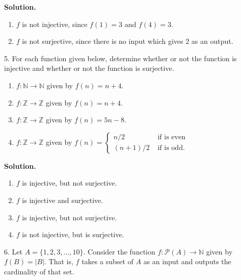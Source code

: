 \documentclass[10pt,]{book}
\theoremstyle{plain}
\theoremstyle{definition}
\theoremstyle{definition}
\theoremstyle{definition}
\def\N{\mathbb N}
\def\Z{\mathbb Z}
\def\pow{\mathcal P}
\newcommand{\amp}{ & }
\begin{document}
\begin{exerciselist}
\begin{enumerate}[label=(\alph*)]
\end{enumerate}
\par\smallskip
\par\smallskip
\noindent\textbf{Solution.}\hypertarget{solution-48}{}\quad
\leavevmode%
\begin{enumerate}[label=(\alph*)]
\item\hypertarget{li-305}{}\(f\) is not injective, since \(f(1) = 3\) and \(f(4) = 3\).\item\hypertarget{li-306}{}\(f\) is not surjective, since there is no input which gives 2 as an output.\end{enumerate}
\item[5.]\hypertarget{exercise-31}{}
            For each function given below, determine whether or not the function is injective and whether or not the function is surjective.
\leavevmode%
\begin{enumerate}[label=(\alph*)]
\item\hypertarget{li-307}{}\(f:\N \to \N\) given by \(f(n) = n+4\).\item\hypertarget{li-308}{}\(f:\Z \to \Z\) given by \(f(n) = n+4\).\item\hypertarget{li-309}{}\(f:\Z \to \Z\) given by \(f(n) = 5n - 8\).\item\hypertarget{li-310}{}\(f:\Z \to \Z\) given by \(f(n) = \begin{cases}n/2 \amp  \mbox{ if  is even} \\ (n+1)/2 \amp \mbox{ if  is odd} . \end{cases}
              \)\end{enumerate}
\par\smallskip
\par\smallskip
\noindent\textbf{Solution.}\hypertarget{solution-49}{}\quad
\leavevmode%
\begin{enumerate}[label=(\alph*)]
\item\hypertarget{li-311}{}\(f\) is injective, but not surjective.\item\hypertarget{li-312}{}\(f\) is injective and surjective.\item\hypertarget{li-313}{}\(f\) is injective, but not surjective.\item\hypertarget{li-314}{}\(f\) is not injective, but is surjective.\end{enumerate}
\item[6.]\hypertarget{exercise-32}{}
            Let \(A = \{1,2,3,\ldots,10\}\). Consider the function \(f:\pow(A) \to \N\) given by \(f(B) = |B|\). That is, \(f\) takes a subset of \(A\) as an input and outputs the cardinality of that set.

\end{exerciselist}
\end{document}
